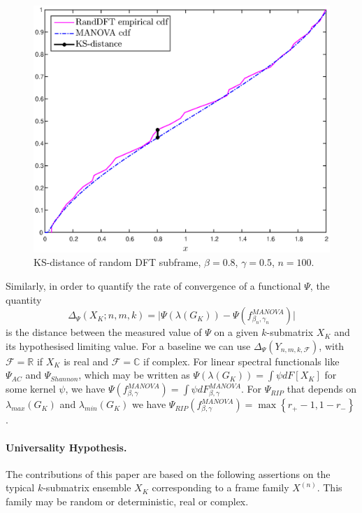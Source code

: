 \documentclass[a4paper,12pt]{article}
\newcommand{\TODO}[1]{ {\tt \color{red} [TODO:#1] } }
\newcommand{\R}{\ensuremath{\mathbb{R}}}
\newcommand{\C}{\ensuremath{\mathbb{C}}}
\newcommand{\Fc}{\ensuremath{\mathcal{F}}}
\newcommand{\m}{m}
\newcommand{\specstat}{\ensuremath{\Psi}}
\newcommand{\Xk}{\ensuremath{X_K}}
\newcommand{\Gk}{\ensuremath{G_K}}
\begin{document}
\begin{figure}[h]
\centering
\includegraphics[width=5in]
{KSdistance_RScdf_MANOVAcdf_n100_2_pnas.eps}
\caption{KS-distance of random DFT subframe, $\beta = 0.8$, $\gamma = 0.5$, $n=100$.}
\label{fig:CDFs}
\end{figure}

Similarly, in order to quantify the rate of convergence of a functional
$\specstat$, the quantity
\[
\Delta_\specstat(\Xk;n,\m,k) = \big| \Psi(\lambda(\Gk)) -
\Psi(f^{MANOVA}_{\beta_n,\gamma_n}) \big|
\]
is the distance between the measured value of $\Psi$ on a given $k$-submatrix
$\Xk$ and its hypothesised limiting value. 
For a baseline we can use $\Delta_\specstat(Y_{n,\m,k,\Fc})$,
with $\Fc=\R$ if $X_K$ is real and $\Fc=\C$ if complex.
For linear spectral functionals 
like $\Psi_{AC}$ and $\Psi_{Shannon}$, which may be written as
$\Psi(\lambda(\Gk))=\int \psi dF[X_K]$ for some kernel $\psi$, we have
$  \Psi(f^{MANOVA}_{\beta,\gamma}) = \int \psi dF^{MANOVA}_{\beta,\gamma}$. 
For $\Psi_{RIP}$ that depends on $\lambda_{max}(\Gk)$ 
and $\lambda_{min}(\Gk)$ we have $\Psi_{RIP}(f^{MANOVA}_{\beta,\gamma}) =
\max\left\{ r_+-1,1-r_- \right\}$.

\paragraph{Universality Hypothesis.} 

The contributions of this paper are based on the following assertions on the typical $k$-submatrix ensemble $\Xk$ corresponding to a frame
family $X^{(n)}$. This family may be random or deterministic, real or complex. 
\end{document}
